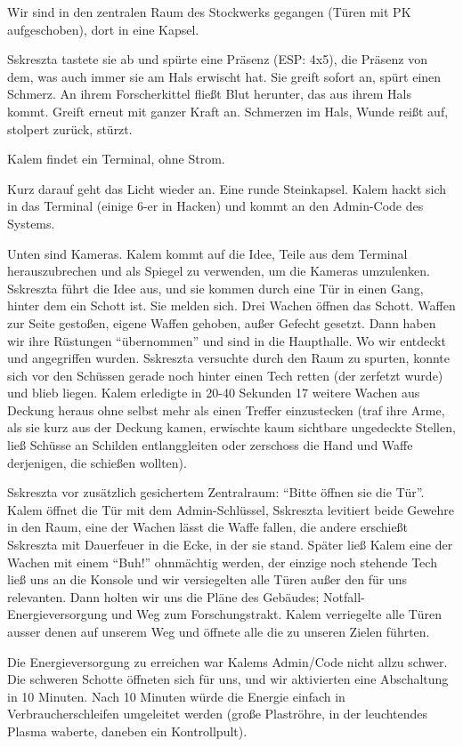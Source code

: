 \documentclass[11pt]{scrartcl}
\begin{document}
Wir sind in den zentralen Raum des Stockwerks gegangen (Türen mit PK
aufgeschoben), dort in eine Kapsel.

Sskreszta tastete sie ab und spürte eine Präsenz (ESP: 4x5), die Präsenz
von dem, was auch immer sie am Hals erwischt hat. Sie greift sofort an,
spürt einen Schmerz. An ihrem Forscherkittel fließt Blut herunter, das
aus ihrem Hals kommt. Greift erneut mit ganzer Kraft an. Schmerzen im
Hals, Wunde reißt auf, stolpert zurück, stürzt.

Kalem findet ein Terminal, ohne Strom.

Kurz darauf geht das Licht wieder an. Eine runde Steinkapsel. Kalem
hackt sich in das Terminal (einige 6-er in Hacken) und kommt an den
Admin-Code des Systems.

Unten sind Kameras. Kalem kommt auf die Idee, Teile aus dem Terminal
herauszubrechen und als Spiegel zu verwenden, um die Kameras umzulenken.
Sskreszta führt die Idee aus, und sie kommen durch eine Tür in einen
Gang, hinter dem ein Schott ist. Sie melden sich. Drei Wachen öffnen das
Schott. Waffen zur Seite gestoßen, eigene Waffen gehoben, außer Gefecht
gesetzt. Dann haben wir ihre Rüstungen ``übernommen'' und sind in die
Haupthalle. Wo wir entdeckt und angegriffen wurden. Sskreszta versuchte
durch den Raum zu spurten, konnte sich vor den Schüssen gerade noch
hinter einen Tech retten (der zerfetzt wurde) und blieb liegen. Kalem
erledigte in 20-40 Sekunden 17 weitere Wachen aus Deckung heraus ohne
selbst mehr als einen Treffer einzustecken (traf ihre Arme, als sie kurz
aus der Deckung kamen, erwischte kaum sichtbare ungedeckte Stellen, ließ
Schüsse an Schilden entlanggleiten oder zerschoss die Hand und Waffe
derjenigen, die schießen wollten).

Sskreszta vor zusätzlich gesichertem Zentralraum: ``Bitte öffnen sie die
Tür''. Kalem öffnet die Tür mit dem Admin-Schlüssel, Sskreszta levitiert
beide Gewehre in den Raum, eine der Wachen lässt die Waffe fallen, die
andere erschießt Sskreszta mit Dauerfeuer in die Ecke, in der sie stand.
Später ließ Kalem eine der Wachen mit einem ``Buh!'' ohnmächtig werden,
der einzige noch stehende Tech ließ uns an die Konsole und wir
versiegelten alle Türen außer den für uns relevanten. Dann holten wir
uns die Pläne des Gebäudes; Notfall-Energieversorgung und Weg zum
Forschungstrakt. Kalem verriegelte alle Türen ausser denen auf unserem
Weg und öffnete alle die zu unseren Zielen führten.

Die Energieversorgung zu erreichen war Kalems Admin/Code nicht allzu
schwer. Die schweren Schotte öffneten sich für uns, und wir aktivierten
eine Abschaltung in 10 Minuten. Nach 10 Minuten würde die Energie
einfach in Verbraucherschleifen umgeleitet werden (große Plaströhre, in
der leuchtendes Plasma waberte, daneben ein Kontrollpult).
\end{document}

